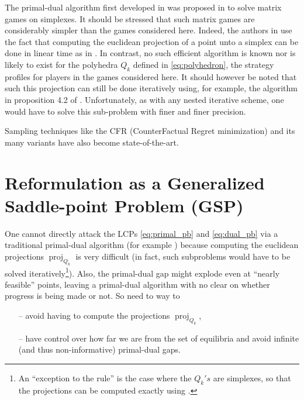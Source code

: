 \documentclass{article} %
\DeclareMathOperator{\proj}{proj}
\begin{document}


The primal-dual algorithm first developed in \cite{chambolle2010} was
proposed \cite{chambolle2014ergodic} in to solve matrix games on
simplexes. It should be stressed that such matrix games are
considerably simpler than the games considered here. Indeed, the
authors in \cite{chambolle2014ergodic} use the fact that computing the
euclidean projection of a point unto a simplex can be done in linear
time as in \cite{duchi2008efficient}. In contrast, no such efficient
algorithm is known nor is likely to exist for the polyhedra $Q_k$
defined in \eqref{eq:polyhedron}, the strategy profiles for players in
the games considered here. It should however be noted that such this
projection can still be done iteratively using, for example, the
algorithm in proposition 4.2 of \cite{combettes2010dualization}%
. Unfortunately, as
with any nested iterative scheme, one would have to solve this
sub-problem with finer and finer precision.


Sampling techniques like the CFR (CounterFactual Regret minimization)
and its many variants
\cite{MartinZinkevichNIPS2007,lanctot2009monte,Bowling09012015} have
also become state-of-the-art.


\section{Reformulation as a Generalized Saddle-point Problem (GSP)}
\label{sec:gsp}
One cannot directly attack the LCPs \eqref{eq:primal_pb} and
\eqref{eq:dual_pb} via a traditional primal-dual algorithm
(for example \cite{chambolle2010,chambolle2014ergodic}) because
computing the euclidean projections $\proj_{Q_k}$ is very difficult
(in fact, such subproblems would have to be solved
iteratively\footnote{An ``exception to the rule'' is the case where
  the $Q_k's$ are simplexes, so that the projections can be computed
  exactly using \cite{duchi2008efficient}.}). Also,
the primal-dual gap might explode even at ``nearly feasible'' points,
leaving a primal-dual algorithm with no clear on whether progress is
being made or not. So need to way to
\begin{itemize}
\item[--] avoid having to compute the projections $\proj_{Q_k}$,
\item[--] have control over how far we are from the set of equilibria and
  avoid infinite (and thus non-informative) primal-dual gaps.
\end{itemize}
\end{document}

